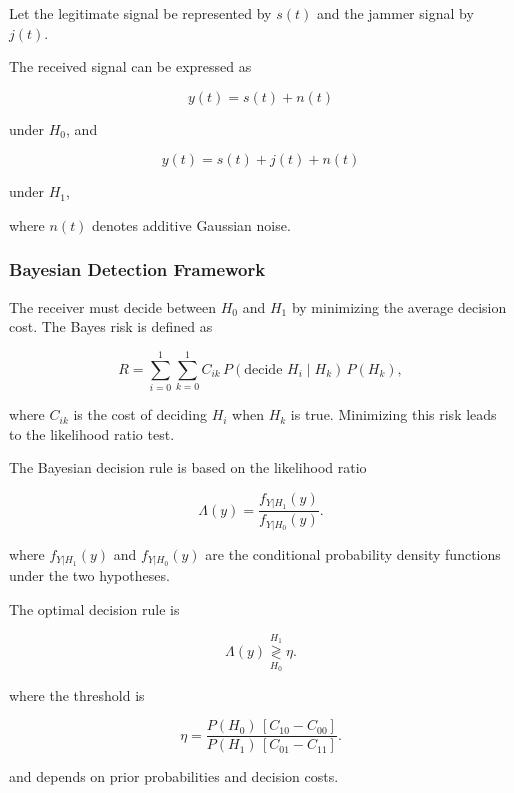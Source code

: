 \documentclass{article}
\begin{document}
Let the legitimate signal be represented by $s(t)$ and the jammer signal by $j(t)$.

The received signal can be expressed as

\begin{equation}
y(t)=s(t)+n(t)
\end{equation}

under $H_0$, and

\begin{equation}
y(t)=s(t)+j(t)+n(t)
\end{equation}

under $H_1$,

where $n(t)$ denotes additive Gaussian noise.

\subsubsection{Bayesian Detection Framework}

The receiver must decide between $H_0$ and $H_1$ by minimizing the average decision cost. The Bayes risk is defined as

\begin{equation}
R = \sum_{i=0}^{1} \sum_{k=0}^{1} C_{ik} \, P(\text{decide } H_i \mid H_k) \, P(H_k),
\end{equation}

where $C_{ik}$ is the cost of deciding $H_i$ when $H_k$ is true. Minimizing this risk leads to the likelihood ratio test.

The Bayesian decision rule is based on the likelihood ratio

\begin{equation}
\Lambda(y)
=
\frac{f_{Y|H_1}(y)}
     {f_{Y|H_0}(y)}.
\end{equation}

where $f_{Y|H_1}(y)$ and $f_{Y|H_0}(y)$ are the conditional probability density functions under the two hypotheses.

The optimal decision rule is

\begin{equation}
\Lambda(y)
\overset{H_1}{\underset{H_0}{\gtrless}}
\eta.
\end{equation}

where the threshold is

\begin{equation}
\eta
=
\frac{P(H_0)\,[C_{10}-C_{00}]}
     {P(H_1)\,[C_{01}-C_{11}]}.
\end{equation}

and depends on prior probabilities and decision costs.
\end{document}
